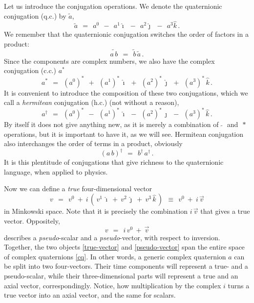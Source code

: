 \documentclass[epsfig,12pt]{article}
\newcommand{\wt}{\widetilde}
\newcommand{\ii}{\hat\imath}
\newcommand{\jj}{\hat\jmath}
\newcommand{\kk}{\hat k}
\begin{document}
	Let us introduce the conjugation operations.
	We denote the quaternionic conjugation (q.c.) by $ \wt a $,
\begin{equation}
	\wt a	~~=~~	a^0  ~~-~~  a^1 \ii  ~~-~~  a^2 \jj  ~~-~~ a^3 \kk\,.
\end{equation}
	We remember that the quaternionic conjugation switches the order of factors in a product:
\begin{equation}
	\wt{a\, b}  ~~=~~  \wt b\, \wt a\,.
\end{equation}
	Since the components are complex numbers, we also have the complex conjugation (c.c.) $ a^* $
\begin{equation}
	a^*	~~=~~	(a^0)^*  ~~+~~  (a^1)^*\, \ii  ~~+~~  (a^2)^*\, \jj  ~~+~~  (a^3)^*\, \kk\,.
\end{equation}
	It is convenient to introduce the composition of these two conjugations, which we call a \emph{hermitean}
	conjugation (h.c.) (not without a reason),
\begin{equation}
	a^\dag	~~=~~	(a^0)^*  ~~-~~  (a^1)^*\, \ii  ~~-~~  (a^2)^*\, \jj  ~~-~~  (a^3)^*\, \kk\,.
\end{equation}
	By itself it does not give anything new, as it is merely a combination of $ \,\wt{~}\, $ and $ \,*\, $ operations,
	but it is important to have it, as we will see.
	Hermitean conjugation also interchanges the order of terms in a product, obviously
\begin{equation}
	(a\, b)^\dag	~~=~~	b^\dag\, a^\dag\,.
\end{equation}
	It is this plentitude of conjugations that give richness to the quaternionic language, when applied to physics.

	Now we can define a \emph{true} four-dimensional vector
\begin{equation}
\label{true-vector}
	v	~~=~~	v^0  ~+~  i\,(\, v^1\,\ii  ~+~  v^2\,\jj  ~+~ v^3\,\kk \,)
		~~\equiv~~	v^0  ~+~  i\,\vec v
\end{equation}
	in Minkowski space.
	Note that it is precisely the combination $ i\,\vec v $ that gives a true vector.
	Oppositely,
\begin{equation}
\label{pseudo-vector}
	v	~~=~~	i\,v^0  ~+~  \vec v
\end{equation}
	describes a \emph{pseudo}-scalar and a \emph{pseudo}-vector, with respect to inversion.
	Together, the two objects \eqref{true-vector} and \eqref{pseudo-vector} span the entire space of 
	complex quaternions \eqref{cq}.
	In other words, a generic complex quaternion $ a $ can be split into two four-vectors.
	Their time components will represent a true- and a pseudo-scalar, while their three-dimensional
	parts will represent a true and an axial vector, correspondingly.
	Notice, how multiplication by the complex $ i $ turns a true vector into an axial vector, and
	the same for scalars.
\end{document}
